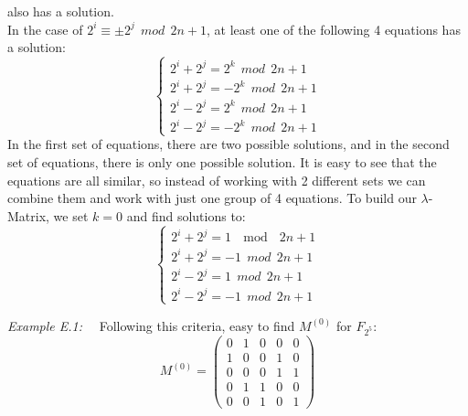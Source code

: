 also has a solution.\\
In the case of $2^i \equiv \pm 2^j \ \ mod\ \  2n+1$, at least one of the following 4 equations has a solution:
\begin{equation}
\begin{cases}
2^i + 2^j = 2^k \ \ mod \ \ 2n+1\\
2^i + 2^j = -2^k \ \ mod \ \ 2n+1\\
2^i - 2^j = 2^k \ \ mod\ \  2n+1\\
2^i - 2^j = -2^k \ \ mod \ \ 2n+1
\end{cases}
\end{equation}
In the first set of equations, there are two possible solutions, and in the second set of equations,
there is only one possible solution. It is easy to see that the equations are all similar, so instead of 
working with 2 different sets we can combine them and work with just one group of 4 equations. To build 
our $\lambda$-Matrix, we set $k=0$ and find solutions to:
\begin{equation}
\begin{cases}
2^i + 2^j = 1 \ \mod\ \  2n+1\\
2^i + 2^j = -1 \ \ mod \ \ 2n+1\\
2^i - 2^j = 1 \ \ mod\ \  2n+1\\
2^i - 2^j = -1 \ \ mod \ \ 2n+1
\end{cases}
\end{equation}

\textit{Example E.1:} \ \ Following this criteria, easy to find $M^{(0)}$ for $F_{2^5}$:
\begin{equation}
M^{(0)} = \left(
\begin{array}{lcccr}
0 & 1 & 0 & 0 & 0\\
1 & 0 & 0 & 1 & 0\\
0 & 0 & 0 & 1 & 1\\
0 & 1 & 1 & 0 & 0\\
0 & 0 & 1 & 0 & 1
\end{array} \right)
\end{equation}
